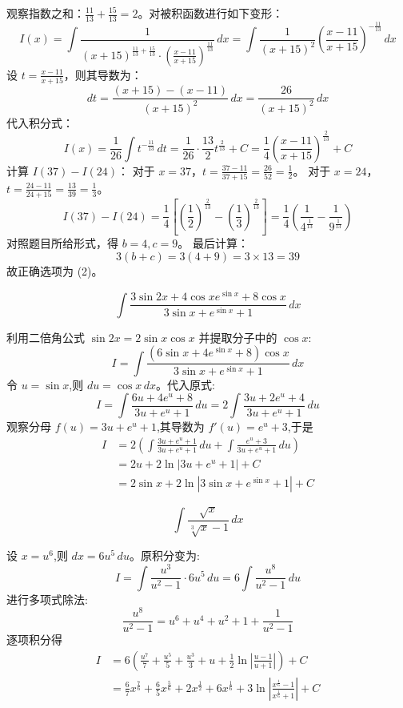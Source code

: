\begin{questions}
\begin{solution}
观察指数之和：$\frac{11}{13} + \frac{15}{13} = 2$。对被积函数进行如下变形：
\[
I(x) = \int \frac{1}{(x+15)^{\frac{11}{13} + \frac{15}{13}} \cdot \left( \frac{x-11}{x+15} \right)^{\frac{11}{13}}} \,dx = \int \frac{1}{(x+15)^2} \left( \frac{x-11}{x+15} \right)^{-\frac{11}{13}} \,dx
\]
设 $t = \frac{x-11}{x+15}$，则其导数为：
\[
dt = \frac{(x+15) - (x-11)}{(x+15)^2} \,dx = \frac{26}{(x+15)^2} \,dx
\]
代入积分式：
\[
I(x) = \frac{1}{26} \int t^{-\frac{11}{13}} \,dt = \frac{1}{26} \cdot \frac{13}{2} t^{\frac{2}{13}} + C = \frac{1}{4} \left( \frac{x-11}{x+15} \right)^{\frac{2}{13}} + C
\]
计算 $I(37) - I(24)$：
对于 $x = 37$，$t = \frac{37-11}{37+15} = \frac{26}{52} = \frac{1}{2}$。
对于 $x = 24$，$t = \frac{24-11}{24+15} = \frac{13}{39} = \frac{1}{3}$。
\[
I(37) - I(24) = \frac{1}{4} \left[ \left( \frac{1}{2} \right)^{\frac{2}{13}} - \left( \frac{1}{3} \right)^{\frac{2}{13}} \right] = \frac{1}{4} \left( \frac{1}{4^{\frac{1}{13}}} - \frac{1}{9^{\frac{1}{13}}} \right)
\]
对照题目所给形式，得 $b = 4, c = 9$。
最后计算：
\[
3(b + c) = 3(4 + 9) = 3 \times 13 = 39
\]
故正确选项为 (2)。
\end{solution}
    \question
    \[
    \int \frac{3\sin 2x + 4\cos x e^{\sin x} + 8\cos x}{3\sin x + e^{\sin x} + 1} \, dx
    \]
    \begin{solution}
        利用二倍角公式 $\sin 2x = 2\sin x \cos x$ 并提取分子中的 $\cos x$:
        \[
        I = \int \frac{(6\sin x + 4e^{\sin x} + 8)\cos x}{3\sin x + e^{\sin x} + 1} \, dx
        \]
        令 $u = \sin x$,则 $du = \cos x \, dx$。代入原式:
        \[
        I = \int \frac{6u + 4e^u + 8}{3u + e^u + 1} \, du = 2 \int \frac{3u + 2e^u + 4}{3u + e^u + 1} \, du
        \]
        观察分母 $f(u) = 3u + e^u + 1$,其导数为 $f'(u) = e^u + 3$,于是
        \begin{align*}
        I &= 2 \left( \int \frac{3u + e^u + 1}{3u + e^u + 1} \, du + \int \frac{e^u + 3}{3u + e^u + 1} \, du \right) \\
        &= 2u + 2\ln|3u + e^u + 1| + C \\
        &= 2\sin x + 2\ln|3\sin x + e^{\sin x} + 1| + C
        \end{align*}
    \end{solution}

\question 
    \[
    \int \frac{\sqrt{x}}{\sqrt[3]{x}-1} \, dx
    \]
    \begin{solution}
        设 $x = u^6$,则 $dx = 6u^5 \, du$。原积分变为:
        \[
        I = \int \frac{u^3}{u^2-1} \cdot 6u^5 \, du = 6 \int \frac{u^8}{u^2-1} \, du
        \]
        进行多项式除法:
        \[
        \frac{u^8}{u^2-1} = u^6+u^4+u^2+1 + \frac{1}{u^2-1}
        \]
        逐项积分得
        \begin{align*}
        I &= 6 \left( \frac{u^7}{7} + \frac{u^5}{5} + \frac{u^3}{3} + u + \frac{1}{2}\ln\left|\frac{u-1}{u+1}\right| \right) + C \\
        &= \frac{6}{7}x^{\frac{7}{6}} + \frac{6}{5}x^{\frac{5}{6}} + 2x^{\frac{1}{2}} + 6x^{\frac{1}{6}} + 3\ln\left|\frac{x^{\frac{1}{6}}-1}{x^{\frac{1}{6}}+1}\right| + C
        \end{align*}
    \end{solution}


\end{questions}
